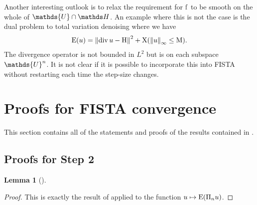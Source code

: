 \documentclass[10pt,a4paper,onecolumn]{article}
\numberwithin{equation}{section}
\newtheorem{lemma}{Lemma}[section]\newtheorem{example}{Example}[section]
\let\F\mathds\let\C\mathcal\newcommand{\R}{\F{R}}\newcommand{\A}{\C{A}}
\newcommand{\norm}[1]{{\left\lVert #1 \right\rVert}}
\newcommand{\op}[1]{\operatorname{#1}}\newcommand{\overtext}[2]{\stackrel{\text{#1}}{#2}}
\newcommand*{\Func}[1]{%
	\IfEqCase{#1}{%
		{0}{\op{E}}%
		{1}{\op{F}}%
		{2}{\op{G}}%
		{3}{\op{H}}%
	}[\op{F}#1]%
}
\newcommand*{\func}[1]{%
	\IfEqCase{#1}{%
		{0}{\op{e}}%
		{1}{\op{f}}%
		{2}{\op{g}}%
		{3}{\op{h}}%
	}[\op{f}#1]%
}
\newcommand*{\varf}[1]{%
	\IfEqCase{#1}{%
		{0}{u}%
		{1}{v}%
		{2}{w}%
	}[u#1]%
}
\newcommand*{\spcf}[1]{%
	\IfEqCase{#1}{%
		{0}{\F{U}}%
		{1}{\F{V}}%
		{2}{\F{W}}%
	}[\F{U}#1]%
}
\begin{document}
Another interesting outlook is to relax the requirement for $\func1$ to be smooth on the whole of $\spcf0\cap\F H$. An example where this is not the case is the dual problem to total variation denoising where we have
$$ \Func0(\varf0) = \norm{\op{div}\varf0-\vdata0}^2 + \chi(\norm{\varf0}_\infty\leq \mu).$$
The divergence operator is not bounded in $L^2$ but is on each subspace $\spcf0^n$. It is not clear if it is possible to incorporate this into FISTA without restarting each time the step-size changes.

\newpage\appendix
\section{Proofs for FISTA convergence}\label{app:ca: FISTA convergence}
This section contains all of the statements and proofs of the results contained in .

\subsection{Proofs for Step 2}

\begin{lemma}[]\label{app:thm:ca: descent lemma}
\end{lemma}
\begin{proof}
	This is exactly the result of \cite[Lemma 1]{Chambolle2015} applied to the function $\varf0\mapsto\Func0(\Pi_n\varf0)$.
\end{proof}
\end{document}
